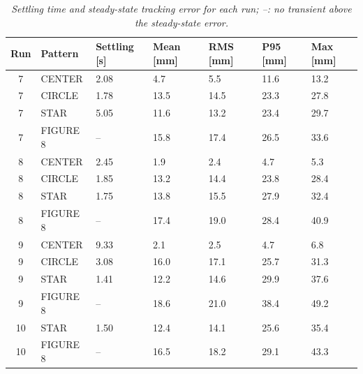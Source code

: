 \begin{table}[H]
\centering
\begin{tabularx}{\textwidth}{|c|l|X|X|X|X|X|}
\hline
\textbf{Run} & \textbf{Pattern} & \textbf{Settling [s]} & \textbf{Mean [mm]} & \textbf{RMS [mm]} & \textbf{P95 [mm]} & \textbf{Max [mm]} \\ \hline
7 & CENTER & 2.08 & 4.7 & 5.5 & 11.6 & 13.2 \\ \hline
7 & CIRCLE & 1.78 & 13.5 & 14.5 & 23.3 & 27.8 \\ \hline
7 & STAR & 5.05 & 11.6 & 13.2 & 23.4 & 29.7 \\ \hline
7 & FIGURE 8 & -- & 15.8 & 17.4 & 26.5 & 33.6 \\ \hline
8 & CENTER & 2.45 & 1.9 & 2.4 & 4.7 & 5.3 \\ \hline
8 & CIRCLE & 1.85 & 13.2 & 14.4 & 23.8 & 28.4 \\ \hline
8 & STAR & 1.75 & 13.8 & 15.5 & 27.9 & 32.4 \\ \hline
8 & FIGURE 8 & -- & 17.4 & 19.0 & 28.4 & 40.9 \\ \hline
9 & CENTER & 9.33 & 2.1 & 2.5 & 4.7 & 6.8 \\ \hline
9 & CIRCLE & 3.08 & 16.0 & 17.1 & 25.7 & 31.3 \\ \hline
9 & STAR & 1.41 & 12.2 & 14.6 & 29.9 & 37.6 \\ \hline
9 & FIGURE 8 & -- & 18.6 & 21.0 & 38.4 & 49.2 \\ \hline
10 & STAR & 1.50 & 12.4 & 14.1 & 25.6 & 35.4 \\ \hline
10 & FIGURE 8 & -- & 16.5 & 18.2 & 29.1 & 43.3 \\ \hline
\end{tabularx}
\caption{\textit{Settling time and steady-state tracking error for each run; --: no transient above the steady-state error.}}
\label{tab:per_run}
\end{table}
